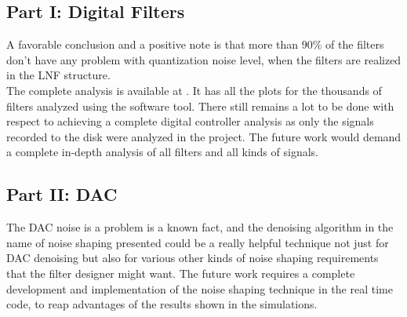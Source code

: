 \documentclass[colorlinks=true,pdfstartview=FitV,linkcolor=blue,
            citecolor=red,urlcolor=magenta]{ligodoc}
\begin{document}
 \subsection{Part I: Digital Filters} A favorable conclusion and a positive note is that more than $90\%$ of the filters don't have any problem with quantization noise level, when the filters are realized in the LNF structure.\\
	The complete analysis is available at \cite{drive}. It has all the plots for the thousands of filters analyzed using the software tool.
There still remains a lot to be done with respect to achieving a complete digital controller analysis as only the signals recorded to the disk were analyzed in the project. The future work would demand a complete in-depth analysis of all filters and all kinds of signals. 
	\subsection{Part II: DAC} The DAC noise is a problem is a known fact, and the denoising algorithm in the name of noise shaping presented could be a really helpful technique not just for DAC denoising but also for various other kinds of noise shaping requirements that the filter designer might want. The future work requires a complete development and implementation of the noise shaping technique in the real time code, to reap advantages of the results shown in the simulations. 
  	
\end{document}
